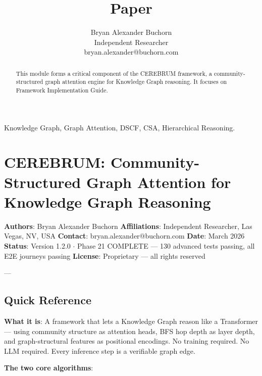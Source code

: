 \documentclass[10pt,journal,compsoc]{IEEEtran}
\begin{document}
\title{Paper}
\author{Bryan Alexander Buchorn \\ Independent Researcher \\ bryan.alexander@buchorn.com}

\maketitle

\begin{abstract}
This module forms a critical component of the CEREBRUM framework, a community-structured graph attention engine for Knowledge Graph reasoning. It focuses on Framework Implementation Guide.
\end{abstract}

\begin{IEEEkeywords}
Knowledge Graph, Graph Attention, DSCF, CSA, Hierarchical Reasoning.
\end{IEEEkeywords}

\section{CEREBRUM: Community-Structured Graph Attention for Knowledge Graph Reasoning}

\textbf{Authors}: Bryan Alexander Buchorn
\textbf{Affili\-ations}: Independent Researcher, Las Vegas, NV, USA
\textbf{Contact}: bryan.alexander@buchorn.com
\textbf{Date}: March 2026
\textbf{Status}: Version 1.2.0 $\cdot$ Phase 21 COMPLETE — 130 advanced tests passing, all E2E journeys passing
\textbf{License}: Proprietary — all rights reserved

---

\subsection{Quick Reference}

\textbf{What it is}: A framework that lets a Knowledge Graph reason like a Transformer —
using community structure as attention heads, BFS hop depth as layer depth, and
graph-structural features as positional encodings. No training required. No LLM required.
Every inference step is a verifiable graph edge.

\textbf{The two core algorithms}:
\end{document}
